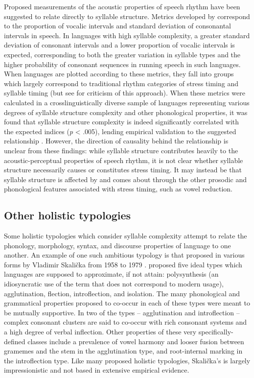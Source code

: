   Proposed measurements of the acoustic properties of speech rhythm have been suggested to relate directly to syllable structure. Metrics developed by \citet{RamusEtAl1999} correspond to the proportion of vocalic intervals and standard deviation of consonantal intervals in speech. In languages with high syllable complexity, a greater standard deviation of consonant intervals and a lower proportion of vocalic intervals is expected, corresponding to both the greater variation in syllable types and the higher probability of consonant sequences in running speech in such languages. When languages are plotted according to these metrics, they fall into groups which largely correspond to traditional rhythm categories of stress timing and syllable timing (but see \citealt{WigetEtAl2010} for criticism of this approach). When these metrics were calculated in a crosslinguistically diverse sample of languages representing various degrees of syllable structure complexity and other phonological properties, it was found that syllable structure complexity is indeed significantly correlated with the expected indices (\textit{p} < .005), lending empirical validation to the suggested relationship \citep{EasterdayEtAl2011}. However, the direction of causality behind the relationship is unclear from these findings: while syllable structure contributes heavily to the acoustic-perceptual properties of speech rhythm, it is not clear whether syllable structure necessarily causes or constitutes stress timing. It may instead be that syllable structure is affected by and comes about through the other prosodic and phonological features associated with stress timing, such as vowel reduction.

\subsection{Other holistic typologies}\label{sec:1.3.2}

 Some holistic typologies which consider syllable complexity attempt to relate the phonology, morphology, syntax, and discourse properties of language to one another. An example of one such ambitious typology is that proposed in various forms by Vladimir Skalička from 1958 to 1979 \citep{Plank1998}. \citet{Skalička1979} proposed five ideal types which languages are supposed to approximate, if not attain: polysynthesis (an idiosyncratic use of the term that does not correspond to modern usage), agglutination, flection, introflection, and isolation. The many phonological and grammatical properties proposed to co-occur in each of these types were meant to be mutually supportive. In two of the types -- agglutination and introflection -- complex consonant clusters are said to co-occur with rich consonant systems and a high degree of verbal inflection. Other properties of these very specifically-defined classes include a prevalence of vowel harmony and looser fusion between gramemes and the stem in the agglutination type, and root-internal marking in the introflection type. Like many proposed holistic typologies, Skalička’s is largely impressionistic and not based in extensive empirical evidence.

